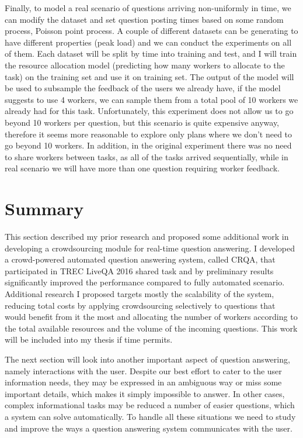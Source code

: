 Finally, to model a real scenario of questions arriving non-uniformly in time, we can modify the dataset and set question posting times based on some random process, \eg Poisson point process.
A couple of different datasets can be generating to have different properties (\eg peak load) and we can conduct the experiments on all of them.
Each dataset will be split by time into training and test, and I will train the resource allocation model (predicting how many workers to allocate to the task) on the training set and use it on training set.
The output of the model will be used to subsample the feedback of the users we already have, \eg if the model suggests to use 4 workers, we can sample them from a total pool of 10 workers we already had for this task.
Unfortunately, this experiment does not allow us to go beyond 10 workers per question, but this scenario is quite expensive anyway, therefore it seems more reasonable to explore only plans where we don't need to go beyond 10 workers.
In addition, in the original experiment there was no need to share workers between tasks, as all of the tasks arrived sequentially, while in real scenario we will have more than one question requiring worker feedback.

\section{Summary}
\label{section:crowdsourcing:summary}

This section described my prior research and proposed some additional work in developing a crowdsourcing module for real-time question answering.
I developed a crowd-powered automated question answering system, called CRQA, that participated in TREC LiveQA 2016 shared task and by preliminary results significantly improved the performance compared to fully automated scenario.
Additional research I proposed targets mostly the scalability of the system, \ie reducing total costs by applying crowdsourcing selectively to questions that would benefit from it the most and allocating the number of workers according to the total available resources and the volume of the incoming questions.
This work will be included into my thesis if time permits.

The next section will look into another important aspect of question answering, namely interactions with the user.
Despite our best effort to cater to the user information needs, they may be expressed in an ambiguous way or miss some important details, which makes it simply impossible to answer.
In other cases, complex informational tasks may be reduced a number of easier questions, which a system can solve automatically.
To handle all these situations we need to study and improve the ways a question answering system communicates with the user.
